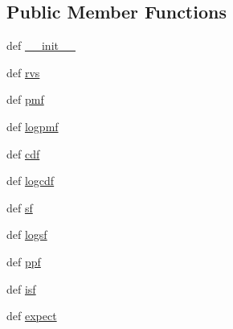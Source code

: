 \subsection*{Public Member Functions}
\begin{DoxyCompactItemize}
\item 
def \hyperlink{classscipy_1_1stats_1_1__distn__infrastructure_1_1rv__discrete_a0d3c413f475d57cbd9a4f443e02e8568}{\+\_\+\+\_\+init\+\_\+\+\_\+}
\item 
def \hyperlink{classscipy_1_1stats_1_1__distn__infrastructure_1_1rv__discrete_a272df4b13447c61cf61ea049841b10fe}{rvs}
\item 
def \hyperlink{classscipy_1_1stats_1_1__distn__infrastructure_1_1rv__discrete_ae776262e679697becf45af2a71dd2fcd}{pmf}
\item 
def \hyperlink{classscipy_1_1stats_1_1__distn__infrastructure_1_1rv__discrete_ac687da2c29ce804b9db2be034474edc2}{logpmf}
\item 
def \hyperlink{classscipy_1_1stats_1_1__distn__infrastructure_1_1rv__discrete_a43e48a7cbd210f4475200860544b87b0}{cdf}
\item 
def \hyperlink{classscipy_1_1stats_1_1__distn__infrastructure_1_1rv__discrete_a78bcc9c060156a8f9d8bf2c23dcf0af0}{logcdf}
\item 
def \hyperlink{classscipy_1_1stats_1_1__distn__infrastructure_1_1rv__discrete_a2b5025ae2d6bb9043e6364adbe3052bd}{sf}
\item 
def \hyperlink{classscipy_1_1stats_1_1__distn__infrastructure_1_1rv__discrete_a675ec9a4603c82c66d2cb0da7e54cc8b}{logsf}
\item 
def \hyperlink{classscipy_1_1stats_1_1__distn__infrastructure_1_1rv__discrete_a700f417bcdcc8189827fe5e1b084802d}{ppf}
\item 
def \hyperlink{classscipy_1_1stats_1_1__distn__infrastructure_1_1rv__discrete_ad6df4b3e6dfb8e08479a1ca1fae2b588}{isf}
\item 
def \hyperlink{classscipy_1_1stats_1_1__distn__infrastructure_1_1rv__discrete_a91448df6e2c1c3fadaaf1ccb4780ac6c}{expect}
\end{DoxyCompactItemize}
